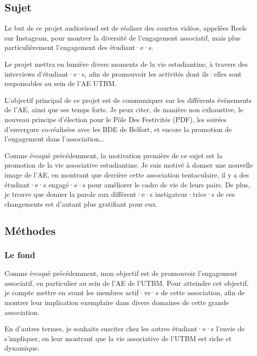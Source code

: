 
\subsection{Sujet}\label{subsec:sujet}

Le but de ce projet audiovisuel est de réaliser des courtes vidéos, appelées Reels sur Instagram, pour montrer la diversité de l'engagement associatif, mais plus particulièrement l'engagement des étudiant·e·s.

Le projet mettra en lumière divers moments de la vie estudiantine, à travers des interviews d'étudiant·e·s, afin de promouvoir les activités dont ils·elles sont responsables au sein de l'\gls{AE} \gls{UTBM}.

L'objectif principal de ce projet est de communiquer sur les différents événements de l'\gls{AE}, ainsi que ses temps forts.
Je peux citer, de manière non exhaustive, le nouveau principe d'élection pour le Pôle Des Festivités (\gls{PDF}), les soirées d'envergure co-réalisées avec les BDE de Belfort, et encore la promotion de l'engagement dans l'association\ldots

Comme évoqué précédemment, la motivation première de ce sujet est la promotion de la vie associative estudiantine.
Je suis motivé à donner une nouvelle image de l'\gls{AE}, en montrant que derrière cette association tentaculaire, il y a des étudiant·e·s engagé·e·s pour améliorer le cadre de vie de leurs pairs.
De plus, je trouve que donner la parole aux différent·e·s instigateur·trice·s de ces changements est d'autant plus gratifiant pour eux.

\subsection{Méthodes}\label{subsec:methodes}

\subsubsection{Le fond}

Comme évoqué précédemment, mon objectif est de promouvoir l'engagement associatif, en particulier au sein de l'\gls{AE} de l'\gls{UTBM}.
Pour atteindre cet objectif, je compte mettre en avant les membres actif·ve·s de cette association, afin de montrer leur implication exemplaire dans divers domaines de cette grande association.

En d'autres termes, je souhaite susciter chez les autres étudiant·e·s l'envie de s'impliquer, en leur montrant que la vie associative de l'\gls{UTBM} est riche et dynamique.

